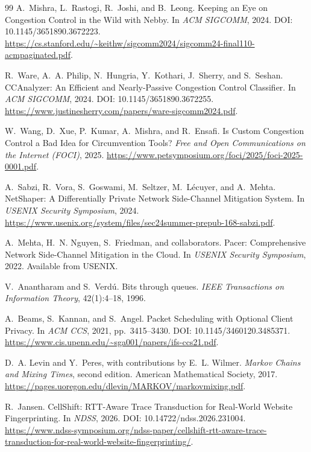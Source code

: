 \documentclass[11pt]{article}
\theoremstyle{definition}
\theoremstyle{remark}
\begin{document}
\begin{thebibliography}{99}
A.~Mishra, L.~Rastogi, R.~Joshi, and B.~Leong.
\newblock Keeping an Eye on Congestion Control in the Wild with Nebby.
\newblock In \emph{ACM SIGCOMM}, 2024.
\newblock DOI: 10.1145/3651890.3672223.
\newblock \url{https://cs.stanford.edu/~keithw/sigcomm2024/sigcomm24-final110-acmpaginated.pdf}.

R.~Ware, A.~A. Philip, N.~Hungria, Y.~Kothari, J.~Sherry, and S.~Seshan.
\newblock CCAnalyzer: An Efficient and Nearly-Passive Congestion Control Classifier.
\newblock In \emph{ACM SIGCOMM}, 2024.
\newblock DOI: 10.1145/3651890.3672255.
\newblock \url{https://www.justinesherry.com/papers/ware-sigcomm2024.pdf}.

W.~Wang, D.~Xue, P.~Kumar, A.~Mishra, and R.~Ensafi.
\newblock Is Custom Congestion Control a Bad Idea for Circumvention Tools?
\newblock \emph{Free and Open Communications on the Internet (FOCI)}, 2025.
\newblock \url{https://www.petsymposium.org/foci/2025/foci-2025-0001.pdf}.

A.~Sabzi, R.~Vora, S.~Goswami, M.~Seltzer, M.~L\'ecuyer, and A.~Mehta.
\newblock NetShaper: A Differentially Private Network Side-Channel Mitigation System.
\newblock In \emph{USENIX Security Symposium}, 2024.
\newblock \url{https://www.usenix.org/system/files/sec24summer-prepub-168-sabzi.pdf}.


A.~Mehta, H.~N. Nguyen, S.~Friedman, and collaborators.
\newblock Pacer: Comprehensive Network Side-Channel Mitigation in the Cloud.
\newblock In \emph{USENIX Security Symposium}, 2022.
\newblock Available from USENIX.

V.~Anantharam and S.~Verd\'u.
\newblock Bits through queues.
\newblock \emph{IEEE Transactions on Information Theory}, 42(1):4--18, 1996.

A.~Beams, S.~Kannan, and S.~Angel.
\newblock Packet Scheduling with Optional Client Privacy.
\newblock In \emph{ACM CCS}, 2021, pp.~3415--3430.
\newblock DOI: 10.1145/3460120.3485371.
\newblock \url{https://www.cis.upenn.edu/~sga001/papers/ifs-ccs21.pdf}.

D.~A. Levin and Y.~Peres, with contributions by E.~L. Wilmer.
\newblock \emph{Markov Chains and Mixing Times}, second edition.
\newblock American Mathematical Society, 2017.
\newblock \url{https://pages.uoregon.edu/dlevin/MARKOV/markovmixing.pdf}.

R.~Jansen.
\newblock CellShift: RTT-Aware Trace Transduction for Real-World Website Fingerprinting.
\newblock In \emph{NDSS}, 2026.
\newblock DOI: 10.14722/ndss.2026.231004.
\newblock \url{https://www.ndss-symposium.org/ndss-paper/cellshift-rtt-aware-trace-transduction-for-real-world-website-fingerprinting/}.



\end{thebibliography}
\end{document}
